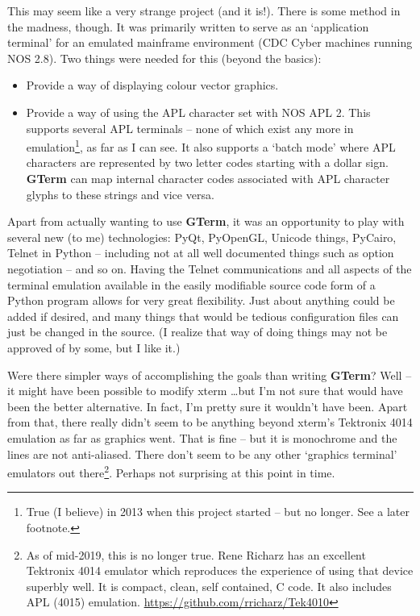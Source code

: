 \documentclass[a4paper,twoside,11pt]{article}
\newcommand{\newpara}{\par\vspace{4mm}\noindent}
\newcommand{\textbfc}[1]{\textcolor{OurRed}{#1}}
\begin{document}
This may seem like a very strange project (and it is!). There is some method in the madness, though.
\textbfc{It was primarily written to serve
as an `application terminal' for an emulated mainframe environment (CDC Cyber machines running NOS 2.8)}.
Two things were needed for this (beyond the basics):
\begin{itemize}
\item \textbfc{Provide a way of displaying colour vector graphics}.
\item \textbfc{Provide a way of using the APL character set with NOS APL 2.} This supports several APL terminals --
      none of which exist any more in emulation\footnote{True (I believe) in 2013 when 
      this project started -- but no longer. See a later footnote.}, 
      as far as I can see. It also supports a `batch mode'
      where APL characters are represented by two letter codes starting with a dollar sign. \textbf{GTerm} can
      map internal character codes associated with APL character glyphs to these strings and vice versa.
\end{itemize}
Apart from actually wanting to use \textbf{GTerm}, it was an opportunity to play with several new (to me) technologies: PyQt, PyOpenGL,
Unicode things, PyCairo, Telnet in Python -- including not at all well documented things such as option negotiation -- and
so on. Having the Telnet communications and all aspects of the terminal emulation available in the easily
modifiable source code form of a Python program allows for very great flexibility. Just about anything could
be added if desired, and many things that would be tedious configuration files can just be changed in the source.
(I realize that way of doing things may not be approved of by some, but I like it.)
\newpara
Were there simpler ways of accomplishing the goals than writing \textbf{GTerm}? Well -- it might have been possible to
modify xterm \ldots but I'm not sure that would have been the better alternative. In fact, I'm pretty sure it wouldn't
have been. Apart from that, there really didn't seem to be anything beyond xterm's Tektronix 4014 emulation as far
as graphics went. That is fine -- but it is monochrome and the lines are not anti-aliased. There don't seem to be
any other `graphics terminal' emulators out there\footnote{As of mid-2019, this is no longer true.
Rene Richarz has an excellent Tektronix 4014 emulator which reproduces the experience of using that
device superbly well. It is compact, clean, self contained, C code. It also includes APL (4015) emulation.
\url{https://github.com/rricharz/Tek4010}}. Perhaps not surprising at this point in time.
\end{document}
